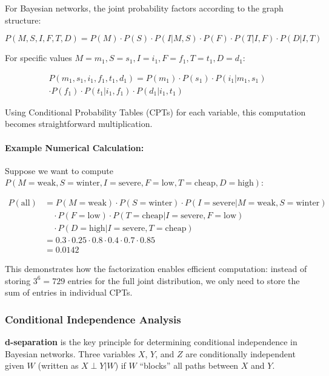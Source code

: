 \documentclass[conference]{IEEEtran}
\begin{document}
For Bayesian networks, the joint probability factors according to the graph structure:

\begin{equation}
P(M, S, I, F, T, D) = P(M) \cdot P(S) \cdot P(I | M, S) \cdot P(F) \cdot P(T | I, F) \cdot P(D | I, T)
\end{equation}

For specific values $M = m_1, S = s_1, I = i_1, F = f_1, T = t_1, D = d_1$:

\begin{multline}
P(m_1, s_1, i_1, f_1, t_1, d_1) = P(m_1) \cdot P(s_1) \cdot P(i_1 | m_1, s_1) \\ 
\cdot P(f_1) \cdot P(t_1 | i_1, f_1) \cdot P(d_1 | i_1, t_1)
\end{multline}

Using Conditional Probability Tables (CPTs) for each variable, this computation becomes straightforward multiplication.

\paragraph{Example Numerical Calculation:}
Suppose we want to compute $P(M=\text{weak}, S=\text{winter}, I=\text{severe}, F=\text{low}, T=\text{cheap}, D=\text{high})$:

\begin{align*}
P(\text{all}) &= P(M=\text{weak}) \cdot P(S=\text{winter}) \cdot P(I=\text{severe} | M=\text{weak}, S=\text{winter}) \\
&\quad \cdot P(F=\text{low}) \cdot P(T=\text{cheap} | I=\text{severe}, F=\text{low}) \\
&\quad \cdot P(D=\text{high} | I=\text{severe}, T=\text{cheap}) \\
&= 0.3 \cdot 0.25 \cdot 0.8 \cdot 0.4 \cdot 0.7 \cdot 0.85 \\
&= 0.0142
\end{align*}

This demonstrates how the factorization enables efficient computation: instead of storing $3^6 = 729$ entries for the full joint distribution, we only need to store the sum of entries in individual CPTs.

\subsubsection{Conditional Independence Analysis}

\textbf{d-separation} is the key principle for determining conditional independence in Bayesian networks. Three variables $X$, $Y$, and $Z$ are conditionally independent given $W$ (written as $X \perp Y | W$) if $W$ ``blocks'' all paths between $X$ and $Y$.
\end{document}
